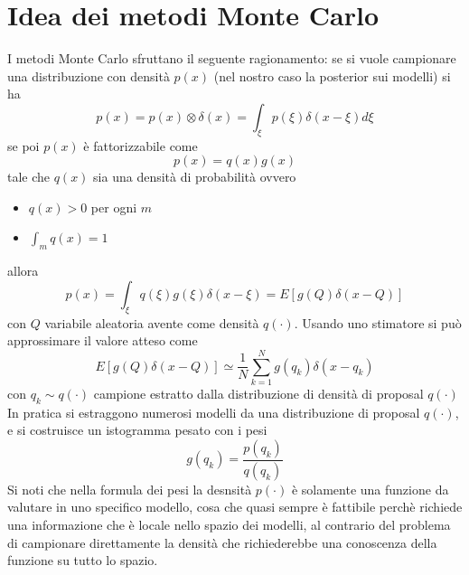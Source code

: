 \documentclass[10pt,a4paper,oneside,openany,noindent]{report}
\begin{document}
\section{Idea dei metodi Monte Carlo}
I metodi Monte Carlo sfruttano il seguente ragionamento: se si vuole  campionare una distribuzione con densità $p(x)$ (nel nostro caso la posterior sui modelli) si ha
\begin{equation}
p(x)=p(x)\otimes \delta(x)=\int_\xi p(\xi)\delta(x-\xi)d\xi
\end{equation}
se poi $p(x)$ è fattorizzabile come \begin{equation}
p(x)=q(x)g(x)
\end{equation}
tale che $q(x)$ sia una densità di probabilità ovvero
\begin{itemize}
\item $q(x)>0$ per ogni $m$
\item $\int_m q(x)=1$
\end{itemize} allora
\begin{equation}
p(x)=\int_\xi q(\xi)g(\xi)\delta(x-\xi)= E[g(Q)\delta(x-Q)]
\end{equation}
con $Q$ variabile aleatoria avente come densità $q(\cdot)$.
Usando uno stimatore si può approssimare il valore atteso come
\begin{equation}
E[g(Q)\delta(x-Q)]\simeq \frac{1}{N}\sum_{k=1}^N g(q_k)\delta(x-q_k)
\end{equation}
con $q_k\sim q(\cdot)$ campione estratto dalla distribuzione di densità di proposal $q(\cdot)$
In pratica si estraggono numerosi modelli da una distribuzione di proposal $q(\cdot)$,
e si costruisce un istogramma pesato con i pesi 
\begin{equation}
g(q_k)=\frac{p(q_k)}{q(q_k)}
\end{equation}
Si noti che nella formula dei pesi la desnsità  $p(\cdot)$ è solamente una funzione da valutare in uno specifico modello, cosa che quasi sempre è fattibile  perchè richiede una informazione che è locale nello spazio dei modelli, al contrario del problema di campionare direttamente la densità che richiederebbe una conoscenza della funzione su tutto lo spazio.\\
\end{document}
